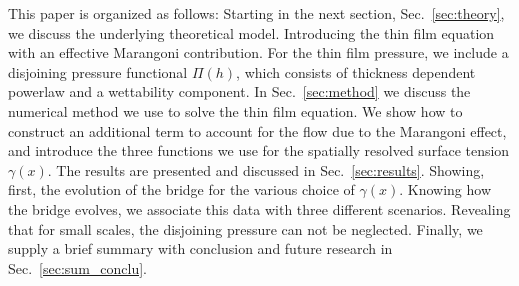 \documentclass[twocolumn,amsmath,amssymb,showpacs,pre,nofootinbib,superscriptaddress]{revtex4-1} %
\begin{document}
This paper is organized as follows:
Starting in the next section, Sec.~\ref{sec:theory}, we discuss the underlying theoretical model.
Introducing the thin film equation with an effective Marangoni contribution. 
For the thin film pressure, we include a disjoining pressure functional $\Pi(h)$, which consists of thickness dependent powerlaw and a wettability component. 
In Sec.~\ref{sec:method} we discuss the numerical method we use to solve the thin film equation.
We show how to construct an additional term to account for the flow due to the Marangoni effect, and
introduce the three functions we use for the spatially resolved surface tension $\gamma(x)$. 
The results are presented and discussed in Sec.~\ref{sec:results}.
Showing, first, the evolution of the bridge for the various choice of $\gamma(x)$.
Knowing how the bridge evolves, we associate this data with three different scenarios.
Revealing that for small scales, the disjoining pressure can not be neglected.
Finally, we supply a brief summary with conclusion and future research in Sec.~\ref{sec:sum_conclu}. 
\end{document}
